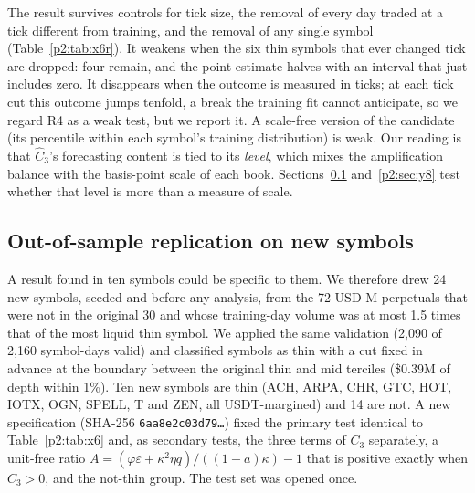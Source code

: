 The result survives controls for tick size, the removal of every day traded at a tick different from training, and the removal of any single symbol (Table~\ref{p2:tab:x6r}). It weakens when the six thin symbols that ever changed tick are dropped: four remain, and the point estimate halves with an interval that just includes zero. It disappears when the outcome is measured in ticks; at each tick cut this outcome jumps tenfold, a break the training fit cannot anticipate, so we regard R4 as a weak test, but we report it. A scale-free version of the candidate (its percentile within each symbol's training distribution) is weak. Our reading is that $\hat C_3$'s forecasting content is tied to its \emph{level}, which mixes the amplification balance with the basis-point scale of each book. Sections~\ref{p2:sec:y6} and~\ref{p2:sec:y8} test whether that level is more than a measure of scale.

\subsection{Out-of-sample replication on new symbols}\label{p2:sec:y6}
A result found in ten symbols could be specific to them. We therefore drew 24 new symbols, seeded and before any analysis, from the 72 USD-M perpetuals that were not in the original 30 and whose training-day volume was at most 1.5 times that of the most liquid thin symbol. We applied the same validation (2{,}090 of 2{,}160 symbol-days valid) and classified symbols as thin with a cut fixed in advance at the boundary between the original thin and mid terciles (\$0.39M of depth within 1\%). Ten new symbols are thin (ACH, ARPA, CHR, GTC, HOT, IOTX, OGN, SPELL, T and ZEN, all USDT-margined) and 14 are not. A new specification (SHA-256 \texttt{6aa8e2c03d79\ldots}) fixed the primary test identical to Table~\ref{p2:tab:x6} and, as secondary tests, the three terms of $C_3$ separately, a unit-free ratio $A=(\varphi\varepsilon+\kappa^2\eta q)/((1-a)\kappa)-1$ that is positive exactly when $C_3>0$, and the not-thin group. The test set was opened once.

